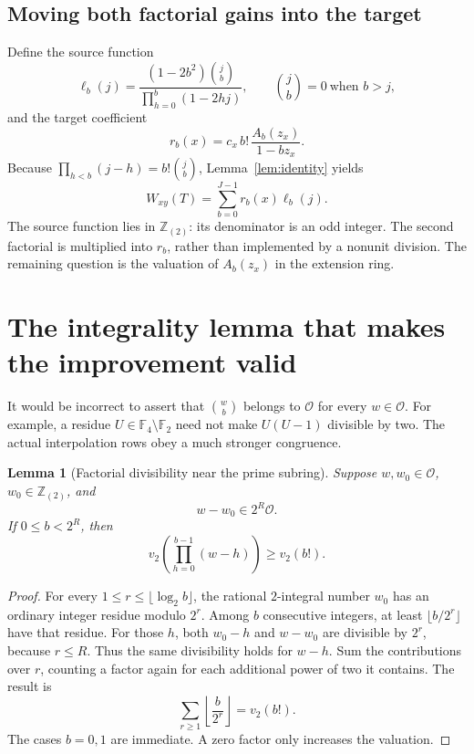 \documentclass[11pt]{article}
\newtheorem{lemma}[theorem]{Lemma}
\theoremstyle{remark}
\newcommand{\OO}{\mathcal O}
\newcommand{\Ztwo}{\mathbb Z_{(2)}}
\begin{document}
\subsection{Moving both factorial gains into the target}

Define the source function
\begin{equation}\label{eq:source-feature}
 \ell_b(j)=
 \frac{(1-2b^2)\binom jb}{\prod_{h=0}^{b}(1-2hj)},
 \qquad \binom jb=0\ \text{when }b>j,
\end{equation}
and the target coefficient
\begin{equation}\label{eq:target-feature}
 r_b(x)=c_x\,b!\,
 \frac{A_b(z_x)}{1-bz_x}.
\end{equation}
Because $\prod_{h<b}(j-h)=b!\binom jb$, Lemma~\ref{lem:identity} yields
\begin{equation}\label{eq:main-separation}
 \boxed{\displaystyle
 W_{xy}(T)=\sum_{b=0}^{J-1}r_b(x)\ell_b(j).}
\end{equation}
The source function lies in $\Ztwo$: its denominator is an odd integer. The second factorial is multiplied into $r_b$, rather than implemented by a nonunit division. The remaining question is the valuation of $A_b(z_x)$ in the extension ring.

\section{The integrality lemma that makes the improvement valid}\label{sec:integrality}

It would be incorrect to assert that $\binom wb$ belongs to $\OO$ for every $w\in\OO$. For example, a residue $U\in\mathbb F_4\setminus\mathbb F_2$ need not make $U(U-1)$ divisible by two. The actual interpolation rows obey a much stronger congruence.

\begin{lemma}[Factorial divisibility near the prime subring]\label{lem:factorial}
Suppose $w,w_0\in\OO$, $w_0\in\Ztwo$, and
\[
 w-w_0\in2^R\OO.
\]
If $0\le b<2^R$, then
\begin{equation}\label{eq:factorial-divisibility}
 v_2\!\left(\prod_{h=0}^{b-1}(w-h)\right)\ge v_2(b!).
\end{equation}
\end{lemma}

\begin{proof}
For every $1\le r\le\lfloor\log_2 b\rfloor$, the rational $2$-integral number $w_0$ has an ordinary integer residue modulo $2^r$. Among $b$ consecutive integers, at least $\lfloor b/2^r\rfloor$ have that residue. For those $h$, both $w_0-h$ and $w-w_0$ are divisible by $2^r$, because $r\le R$. Thus the same divisibility holds for $w-h$. Sum the contributions over $r$, counting a factor again for each additional power of two it contains. The result is
\[
 \sum_{r\ge1}\left\lfloor\frac b{2^r}\right\rfloor=v_2(b!).
\]
The cases $b=0,1$ are immediate. A zero factor only increases the valuation.
\end{proof}
\end{document}

